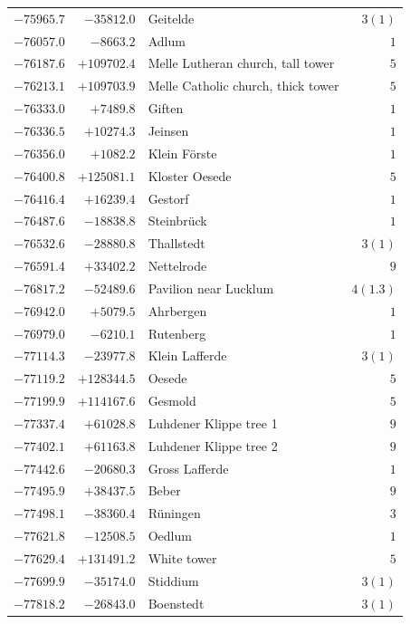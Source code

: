 \begin{center}
\begin{tabular}{r|r|p{170pt}|r}
\(-75965.7\)&\(-35812.0\)&Geitelde&\(3 (1)\)\\
\(-76057.0\)&\(-8663.2\)&Adlum&\(1\)\\
\(-76187.6\)&\(+109702.4\)&Melle Lutheran church, tall tower&\(5\)\\
\(-76213.1\)&\(+109703.9\)&Melle Catholic church, thick tower&\(5\)\\
\(-76333.0\)&\(+7489.8\)&Giften&\(1\)\\
\(-76336.5\)&\(+10274.3\)&Jeinsen&\(1\)\\
\(-76356.0\)&\(+1082.2\)&Klein Förste&\(1\)\\
\(-76400.8\)&\(+125081.1\)&Kloster Oesede&\(5\)\\
\(-76416.4\)&\(+16239.4\)&Gestorf&\(1\)\\
\(-76487.6\)&\(-18838.8\)&Steinbrück&\(1\)\\
\(-76532.6\)&\(-28880.8\)&Thallstedt&\(3 (1)\)\\
\(-76591.4\)&\(+33402.2\)&Nettelrode&\(9\)\\
\(-76817.2\)&\(-52489.6\)&Pavilion near Lucklum&\(4(1.3)\)\\
\(-76942.0\)&\(+5079.5\)&Ahrbergen&\(1\)\\
\(-76979.0\)&\(-6210.1\)&Rutenberg&\(1\)\\
\(-77114.3\)&\(-23977.8\)&Klein Lafferde&\(3 (1)\)\\
\(-77119.2\)&\(+128344.5\)&Oesede&\(5\)\\
\(-77199.9\)&\(+114167.6\)&Gesmold&\(5\)\\
\(-77337.4\)&\(+61028.8\)&Luhdener Klippe tree 1&\(9\)\\
\(-77402.1\)&\(+61163.8\)&Luhdener Klippe tree 2&\(9\)\\
\(-77442.6\)&\(-20680.3\)&Gross Lafferde&\(1\)\\
\(-77495.9\)&\(+38437.5\)&Beber&\(9\)\\
\(-77498.1\)&\(-38360.4\)&Rüningen&\(3\)\\
\(-77621.8\)&\(-12508.5\)&Oedlum&\(1\)\\
\(-77629.4\)&\(+131491.2\)&White tower&\(5\)\\
\(-77699.9\)&\(-35174.0\)&Stiddium&\(3 (1)\)\\
\(-77818.2\)&\(-26843.0\)&Boenstedt&\(3 (1)\)\\
\hline\end{tabular}\endgroup\end{center}
\clearpage
